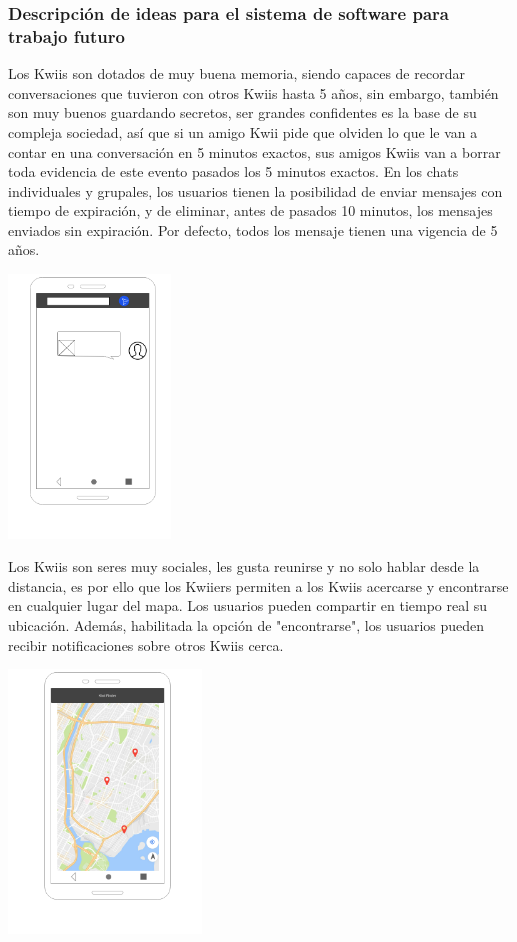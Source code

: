 \subsubsection{Descripción de ideas para el sistema de software para trabajo futuro}
Los Kwiis son dotados de muy buena memoria, siendo capaces de recordar conversaciones que tuvieron con otros Kwiis hasta 5 años, sin embargo, también son muy buenos guardando secretos, ser grandes confidentes es la base de su compleja sociedad, así que si un amigo Kwii pide que olviden lo que le van a contar en una conversación en 5 minutos exactos, sus amigos Kwiis van a borrar toda evidencia de este evento pasados los 5 minutos exactos. En los chats individuales y grupales, los usuarios tienen la posibilidad de enviar mensajes con tiempo de expiración, y de eliminar, antes de pasados 10 minutos, los mensajes enviados sin expiración. Por defecto, todos los mensaje tienen una vigencia de 5 años.
\begin{center}
    \includegraphics[height=7cm]{Figures/P1/example_3.jpeg}    
\end{center}
Los Kwiis son seres muy sociales, les gusta reunirse y no solo hablar desde la distancia, es por ello que los Kwiiers permiten a los Kwiis acercarse y encontrarse en cualquier lugar del mapa. Los usuarios pueden compartir en tiempo real su ubicación. Además, habilitada la opción de "encontrarse", los usuarios pueden recibir notificaciones sobre otros Kwiis cerca.
\begin{center}
    \includegraphics[height=7cm]{Figures/P1/example_4.jpeg}    
\end{center}
